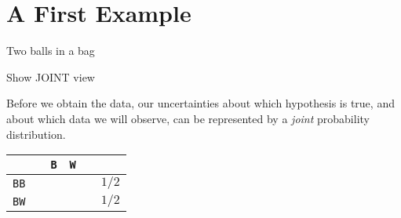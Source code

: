 \chapter{A First Example}

Two balls in a bag

Show JOINT view

Before we obtain the data, our uncertainties about which hypothesis is true,
and about which data we will observe, can be represented by a {\it joint}
probability distribution.

\begin{table}
\begin{center}
\begin{tabular}{cccccc}
 & \vline & {\tt B} & {\tt W} & \vline & \\
\hline
{\tt BB} & \vline & & & \vline & $1/2$\\
{\tt BW} & \vline & & & \vline & $1/2$\\
\hline
\end{tabular}
\end{center}
\end{table}
